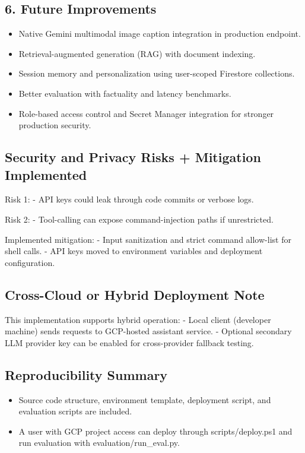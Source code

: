 \documentclass[
]{article}
\providecommand{\tightlist}{%
  \setlength{\itemsep}{0pt}\setlength{\parskip}{0pt}}
\begin{document}
\subsection{6. Future Improvements}\label{future-improvements}

\begin{itemize}
\tightlist
\item
  Native Gemini multimodal image caption integration in production
  endpoint.
\item
  Retrieval-augmented generation (RAG) with document indexing.
\item
  Session memory and personalization using user-scoped Firestore
  collections.
\item
  Better evaluation with factuality and latency benchmarks.
\item
  Role-based access control and Secret Manager integration for stronger
  production security.
\end{itemize}

\subsection{Security and Privacy Risks + Mitigation
Implemented}\label{security-and-privacy-risks-mitigation-implemented}

Risk 1: - API keys could leak through code commits or verbose logs.

Risk 2: - Tool-calling can expose command-injection paths if
unrestricted.

Implemented mitigation: - Input sanitization and strict command
allow-list for shell calls. - API keys moved to environment variables
and deployment configuration.

\subsection{Cross-Cloud or Hybrid Deployment
Note}\label{cross-cloud-or-hybrid-deployment-note}

This implementation supports hybrid operation: - Local client (developer
machine) sends requests to GCP-hosted assistant service. - Optional
secondary LLM provider key can be enabled for cross-provider fallback
testing.

\subsection{Reproducibility Summary}\label{reproducibility-summary}

\begin{itemize}
\tightlist
\item
  Source code structure, environment template, deployment script, and
  evaluation scripts are included.
\item
  A user with GCP project access can deploy through scripts/deploy.ps1
  and run evaluation with evaluation/run\_eval.py.
\end{itemize}
\end{document}
